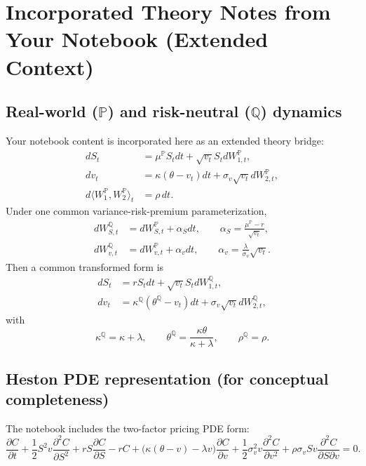 \documentclass[11pt]{article}
\begin{document}
\section{Incorporated Theory Notes from Your Notebook (Extended Context)}

\subsection{Real-world ($\mathbb{P}$) and risk-neutral ($\mathbb{Q}$) dynamics}
Your notebook content is incorporated here as an extended theory bridge:
\begin{align}
 dS_t &= \mu^{\mathbb{P}} S_t dt + \sqrt{v_t}S_t dW_{1,t}^{\mathbb{P}},\\
 dv_t &= \kappa(\theta-v_t)dt + \sigma_v\sqrt{v_t}dW_{2,t}^{\mathbb{P}},\\
 d\langle W_1^{\mathbb{P}},W_2^{\mathbb{P}}\rangle_t &= \rho\,dt.
\end{align}
Under one common variance-risk-premium parameterization,
\begin{align}
 dW_{S,t}^{\mathbb{Q}} &= dW_{S,t}^{\mathbb{P}} + \alpha_S dt, \qquad \alpha_S = \frac{\mu^{\mathbb{P}}-r}{\sqrt{v_t}},\\
 dW_{v,t}^{\mathbb{Q}} &= dW_{v,t}^{\mathbb{P}} + \alpha_v dt, \qquad \alpha_v = \frac{\lambda}{\sigma_v}\sqrt{v_t}.
\end{align}
Then a common transformed form is
\begin{align}
 dS_t &= rS_tdt + \sqrt{v_t}S_t dW_{1,t}^{\mathbb{Q}},\\
 dv_t &= \kappa^{\mathbb{Q}}(\theta^{\mathbb{Q}}-v_t)dt + \sigma_v\sqrt{v_t}dW_{2,t}^{\mathbb{Q}},
\end{align}
with
\begin{equation}
\kappa^{\mathbb{Q}}=\kappa+\lambda,
\qquad
\theta^{\mathbb{Q}}=\frac{\kappa\theta}{\kappa+\lambda},
\qquad
\rho^{\mathbb{Q}}=\rho.
\end{equation}

\subsection{Heston PDE representation (for conceptual completeness)}
The notebook includes the two-factor pricing PDE form:
\begin{equation}
\frac{\partial C}{\partial t}
+\frac12 S^2v\frac{\partial^2 C}{\partial S^2}
+rS\frac{\partial C}{\partial S}
-rC
+\big(\kappa(\theta-v)-\lambda v\big)\frac{\partial C}{\partial v}
+\frac12\sigma_v^2v\frac{\partial^2 C}{\partial v^2}
+\rho\sigma_vSv\frac{\partial^2 C}{\partial S\partial v}=0.
\end{equation}
\end{document}
